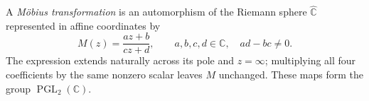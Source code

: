 
A \emph{Möbius transformation} is an automorphism of the Riemann sphere $\widehat{\mathbb C}$ represented in affine coordinates by
\[
M(z)=\frac{az+b}{cz+d},\qquad a,b,c,d\in\mathbb C,\quad ad-bc\ne0.
\]
The expression extends naturally across its pole and $z=\infty$; multiplying all four coefficients by the same nonzero scalar leaves $M$ unchanged. These maps form the group $\operatorname{PGL}_2(\mathbb C)$.
